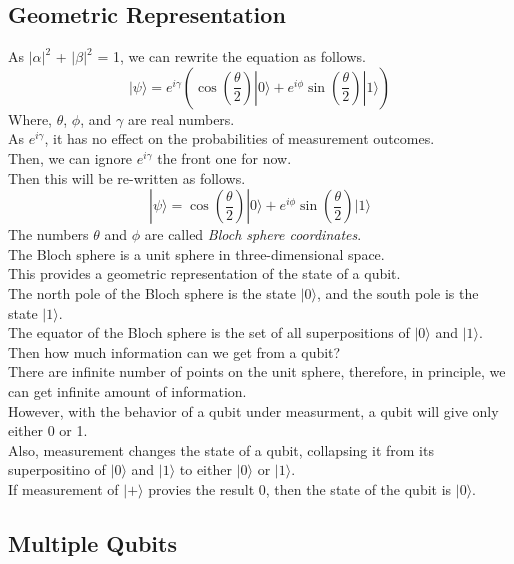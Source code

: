 \documentclass{article}
\begin{document}
\subsection{Geometric Representation}
As $|\alpha|^2$ + $|\beta|^2$ = 1, we can rewrite the equation as follows. \\
\begin{equation}
    |\psi\rangle = e^{i\gamma} (\cos(\frac{\theta}{2}) |0\rangle + e^{i\phi} \sin(\frac{\theta}{2}) |1\rangle)
\end{equation}
Where, $\theta$, $\phi$, and $\gamma$ are real numbers. \\
As $e^{i\gamma}$, it has no effect on the probabilities of measurement outcomes. \\
Then, we can ignore $e^{i\gamma}$ the front one for now. \\
Then this will be re-written as follows. \\
\begin{equation}
    |\psi\rangle = \cos(\frac{\theta}{2}) |0\rangle + e^{i\phi} \sin(\frac{\theta}{2}) |1\rangle
\end{equation}
The numbers $\theta$ and $\phi$ are called \textit{Bloch sphere coordinates}. \\
The Bloch sphere is a unit sphere in three-dimensional space. \\
This provides a geometric representation of the state of a qubit. \\
The north pole of the Bloch sphere is the state $|0\rangle$, and the south pole is the state $|1\rangle$. \\
The equator of the Bloch sphere is the set of all superpositions of $|0\rangle$ and $|1\rangle$. \\
Then how much information can we get from a qubit? \\
There are infinite number of points on the unit sphere, therefore, in principle, we can get infinite amount of information. \\
However, with the behavior of a qubit under measurment, a qubit will give only either 0 or 1. \\
Also, measurement changes the state of a qubit, collapsing it from its superpositino of $|0\rangle$ and $|1\rangle$ to either $|0\rangle$ or $|1\rangle$. \\
If measurement of $|+\rangle$ provies the result 0, then the state of the qubit is $|0\rangle$. \\
\subsection{Multiple Qubits}
\end{document}
